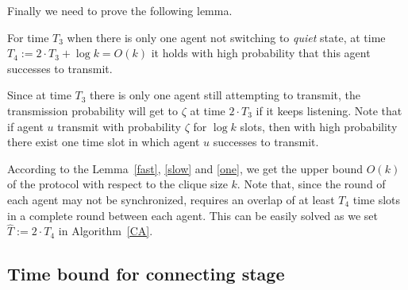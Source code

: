Finally we need to prove the following lemma.
\begin{lemma}
    \label{one}
    For time $T_3$ when there is only one agent not switching to \emph{quiet} state,
    at time $T_4 := 2 \cdot T_3 + \log k = O(k)$ it holds with high 
    probability that this agent successes to transmit.
\end{lemma}
\begin{IEEEproof}
    Since at time $T_3$ there is only one agent still attempting to transmit,
    the transmission probability will get to $\zeta$ at time $2\cdot T_3$ if it keeps
    listening. Note that if agent $u$ transmit with probability $\zeta$ for $\log k$ slots,
    then with high probability there exist one time slot in which agent $u$ successes to transmit.
\end{IEEEproof}

According to the Lemma~\ref{fast}, \ref{slow} and \ref{one},
we get the upper bound $O(k)$ of the {\pName} protocol with respect to
the clique size $k$. Note that, since the round of each agent may not be 
synchronized, {\pName} requires an overlap of at least $T_4$ time 
slots in a complete round between each agent.
This can be easily solved as we set $\hat{T} := 2\cdot T_4$ in Algorithm~\ref{CA}. 

\subsection{Time bound for connecting stage}
\label{boundPC}